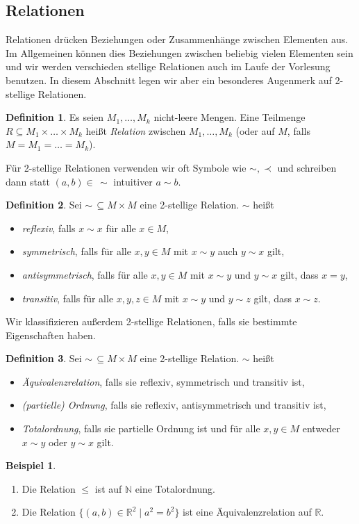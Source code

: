 \documentclass[11pt, a4paper]{article}
\theoremstyle{definition}
\newtheorem{definition}{Definition}[section]
\newtheorem*{example*}{Beispiel}
\theoremstyle{plain}
\numberwithin{equation}{section}
\begin{document}
\subsection{Relationen}\label{sec:pre_relations}
Relationen drücken Beziehungen oder Zusammenhänge zwischen Elementen aus. Im Allgemeinen können dies Beziehungen zwischen beliebig vielen Elementen sein und wir werden verschieden stellige Relationen auch im Laufe der Vorlesung benutzen. In diesem Abschnitt legen wir aber ein besonderes Augenmerk auf 2-stellige Relationen.
\begin{definition}
	Es seien \( M_1, \ldots, M_k \) nicht-leere Mengen. Eine Teilmenge \( R \subseteq M_1 \times \ldots \times M_k \) heißt \textit{Relation} zwischen \( M_1, \ldots, M_k \) (oder auf \( M \), falls \( M = M_1 = \ldots = M_k \)).
\end{definition}
Für 2-stellige Relationen verwenden wir oft Symbole wie \( \sim, \prec \) und schreiben dann statt \( (a, b) \in\, \sim \) intuitiver \( a \sim b \).
\begin{definition}
	Sei \( \sim \,\subseteq M \times M \) eine 2-stellige Relation. \( \sim \) heißt
	\begin{itemize}
		\item \textit{reflexiv}, falls \( x \sim x \) für alle \( x \in M \),
		\item \textit{symmetrisch}, falls für alle \( x, y \in M \) mit \( x \sim y \) auch \( y \sim x \) gilt,
		\item \textit{antisymmetrisch}, falls für alle \( x, y \in M \) mit \( x \sim y \) und \( y \sim x \) gilt, dass \( x = y \),
		\item \textit{transitiv}, falls für alle \( x, y, z \in M \) mit \( x \sim y \) und \( y \sim z \) gilt, dass \( x \sim z \).
	\end{itemize}
\end{definition}
Wir klassifizieren außerdem 2-stellige Relationen, falls sie bestimmte Eigenschaften haben.
\begin{definition}\label{def:relations}
	Sei \( \sim \,\subseteq M \times M \) eine 2-stellige Relation. \( \sim \) heißt
	\begin{itemize}
		\item \textit{Äquivalenzrelation}, falls sie reflexiv, symmetrisch und transitiv ist,
		\item \textit{(partielle) Ordnung}, falls sie reflexiv, antisymmetrisch und transitiv ist,
		\item \textit{Totalordnung}, falls sie partielle Ordnung ist und für alle \( x, y \in M \) entweder \( x \sim y \) oder \( y \sim x \) gilt. 
	\end{itemize}	 
\end{definition}
\begin{example*}
	\
	\begin{enumerate}
		\item Die Relation \( \leq \) ist auf \( \mathbb{N} \) eine Totalordnung.
		\item Die Relation \( \{(a, b) \in \mathbb{R}^2 \mid a^2 = b^2 \} \) ist eine Äquivalenzrelation auf \( \mathbb{R} \).
	\end{enumerate}
\end{example*}
\end{document}
